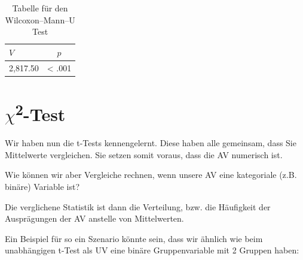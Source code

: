 \documentclass[
]{book}
\newenvironment{Shaded}{\begin{snugshade}}{\end{snugshade}}
\newcommand{\AttributeTok}[1]{\textcolor[rgb]{0.77,0.63,0.00}{#1}}
\newcommand{\FunctionTok}[1]{\textcolor[rgb]{0.00,0.00,0.00}{#1}}
\newcommand{\NormalTok}[1]{#1}
\newcommand{\OtherTok}[1]{\textcolor[rgb]{0.56,0.35,0.01}{#1}}
\newcommand{\SpecialCharTok}[1]{\textcolor[rgb]{0.00,0.00,0.00}{#1}}
\newcommand{\StringTok}[1]{\textcolor[rgb]{0.31,0.60,0.02}{#1}}
\begin{document}
\begin{Shaded}
\end{Shaded}

\begin{table}[tbp]

\begin{center}
\begin{threeparttable}

\caption{\label{tab:unnamed-chunk-282}Tabelle für den Wilcoxon–Mann–U Test}

\begin{tabular}{ll}
\toprule
$V$ & \multicolumn{1}{c}{$p$}\\
\midrule
2,817.50 & < .001\\
\bottomrule
\end{tabular}

\end{threeparttable}
\end{center}

\end{table}

\hypertarget{chi2-test}{%
\section{\texorpdfstring{\(\chi\)\textsuperscript{2}-Test}{\textbackslash chi2-Test}}\label{chi2-test}}

Wir haben nun die t-Tests kennengelernt. Diese haben alle gemeinsam, dass Sie Mittelwerte vergleichen. Sie setzen somit voraus, dass die AV numerisch ist.

Wie können wir aber Vergleiche rechnen, wenn unsere AV eine kategoriale (z.B. binäre) Variable ist?

Die verglichene Statistik ist dann die Verteilung, bzw. die Häufigkeit der Ausprägungen der AV anstelle von Mittelwerten.

Ein Beispiel für so ein Szenario könnte sein, dass wir ähnlich wie beim unabhängigen t-Test als UV eine binäre Gruppenvariable mit 2 Gruppen haben:
\end{document}

